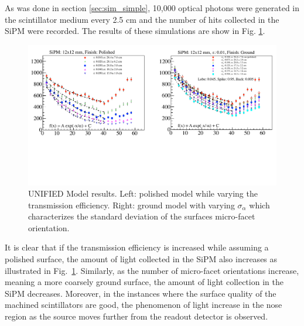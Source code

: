 As was done in section \ref{sec:sim_simple}, 10,000 optical photons were generated in the scintillator medium every 2.5 cm and the number of hits collected in the SiPM were recorded.  The results of these simulations are show in Fig. \ref{fig:transm_eff_vs_sig_alpha}.
	\begin{figure}[!htb]
	\centering
	\includegraphics[width=1.0\columnwidth]{simulation/figs/transm_eff_vs_sig_alpha}
	\caption{UNIFIED Model results.  Left: polished model while varying the transmission efficiency.  Right: ground model with varying $\sigma_{\alpha}$ which characterizes the standard deviation of the surfaces micro-facet orientation.}
	\label{fig:transm_eff_vs_sig_alpha}
	\end{figure}
It is clear that if the transmission efficiency is increased while assuming a polished surface, the amount of light collected in the SiPM also increases as illustrated in Fig.~\ref{fig:transm_eff_vs_sig_alpha}.  Similarly, as the number of micro-facet orientations increase, meaning a more coarsely ground surface, the amount of light collection in the SiPM decreases.  Moreover, in the instances where the surface quality of the machined scintillators are good, the phenomenon of light increase in the nose region as the source moves further from the readout detector is observed.

